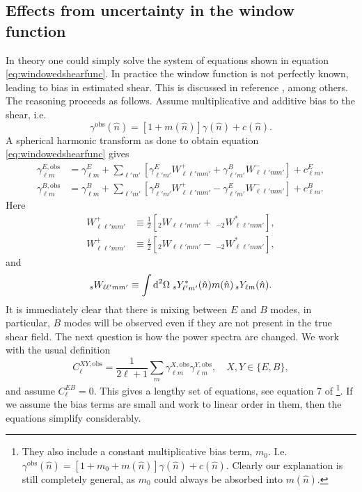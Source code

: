 \documentclass[11pt]{book}
\DeclareRobustCommand{\d}{\ifmmode\text{d}\else d\fi}
\newcommand{\sbr}[1]{\ensuremath{\left[ #1 \right]}}
\begin{document}
\subsection{Effects from uncertainty in the window function}
In theory one could simply solve the system of equations shown in equation \ref{eq:windowedshearfunc}. In practice the window function is not perfectly known, %
 leading to bias in estimated shear. This is discussed in reference \cite{2019OJAp....2E...5K}, among others. The reasoning proceeds as follows. Assume multiplicative and additive bias to the shear, i.e.
 \begin{equation}
 	\gamma^{\text{obs}}(\hat n)=\sbr{1+m(\hat n)}\gamma(\hat n) + c(\hat n).
 \end{equation}
 A spherical harmonic transform as done to obtain equation \ref{eq:windowedshearfunc} gives
 \begin{align}
 	\gamma^{E,\text{obs}}_{\ell m} &= \gamma^E_{\ell m} + \sum_{\ell'm'}\sbr{\gamma^E_{\ell'm'}W^+_{\ell\ell' m m'} + \gamma^B_{\ell' m'}W^-_{\ell\ell' m m'}} + c^E_{\ell m}, \\
 	\gamma^{B,\text{obs}}_{\ell m} &= \gamma^B_{\ell m} + \sum_{\ell'm'}\sbr{\gamma^B_{\ell'm'}W^+_{\ell\ell' m m'} - \gamma^E_{\ell' m'}W^-_{\ell\ell' m m'}} + c^B_{\ell m}. 
 \end{align}
 Here
 \begin{align}
 	W^+_{\ell\ell'mm'} &\equiv \frac{1}{2}\sbr{_2W_{\ell\ell'mm'} + \;_{-2}W^*_{\ell\ell'mm'}}, \\
  	W^+_{\ell\ell'mm'} &\equiv \frac{i}{2}\sbr{_2W_{\ell\ell'mm'} - \;_{-2}W^*_{\ell\ell'mm'}},
 \end{align}
 and
 \begin{equation}
 	_sW_{\ell\ell'mm'}\equiv\int \d^2\Omega \;_sY^*_{\ell'm'}(\hat n)m(\hat n)\,_sY_{\ell m}(\hat n).
 \end{equation}
 It is immediately clear that there is mixing between $E$ and $B$ modes, in particular, $B$ modes will be observed even if they are not present in the true shear field.
 The next question is how the power spectra are changed. We work with the usual definition
 \begin{equation}
 	C^{XY, \text{obs}}_{\ell} = \frac{1}{2\ell+1}\sum_m \gamma^{X,\text{obs}}_{\ell m} \gamma^{Y,\text{obs}}_{\ell m}, \quad X,Y\in\{E,B\},
 \end{equation}
and assume $C^{EB}_\ell = 0$. This gives a lengthy set of equations, see equation 7 of \cite{2019OJAp....2E...5K}\footnote{They also include a constant multiplicative bias term, $m_0$. I.e. $\gamma^{\text{obs}}(\hat n)=\sbr{1+m_0+m(\hat n)}\gamma(\hat n) + c(\hat n)$. Clearly our explanation is still completely general, as $m_0$ could always be absorbed into $m(\hat n)$.}. If we assume the bias terms are small and work to linear order in them, then the equations simplify considerably.
\end{document}
